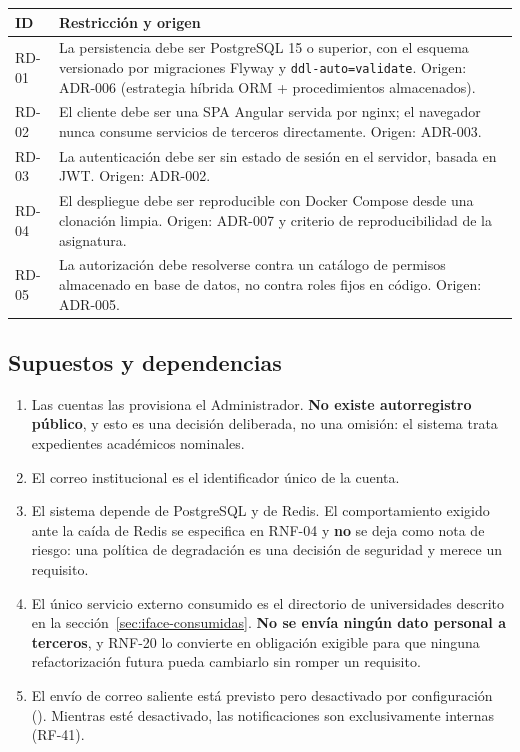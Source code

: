 \documentclass[11pt,a4paper]{article}
\DeclareRobustCommand{\cd}[1]{\texttt{\protect\seqsplit{#1}}}
\begin{document}
\begin{table}[H]\centering\small
\begin{tabular}{p{1.5cm} p{13.2cm}}
\toprule
\textbf{ID} & \textbf{Restricción y origen} \\
\midrule
RD-01 & La persistencia debe ser PostgreSQL 15 o superior, con el esquema versionado por
migraciones Flyway y \texttt{ddl-auto=validate}. Origen: ADR-006 (estrategia híbrida
ORM + procedimientos almacenados). \\
RD-02 & El cliente debe ser una SPA Angular servida por nginx; el navegador nunca consume
servicios de terceros directamente. Origen: ADR-003. \\
RD-03 & La autenticación debe ser sin estado de sesión en el servidor, basada en JWT.
Origen: ADR-002. \\
RD-04 & El despliegue debe ser reproducible con Docker Compose desde una clonación limpia.
Origen: ADR-007 y criterio de reproducibilidad de la asignatura. \\
RD-05 & La autorización debe resolverse contra un catálogo de permisos almacenado en base de
datos, no contra roles fijos en código. Origen: ADR-005. \\
\bottomrule
\end{tabular}
\end{table}

\subsection{Supuestos y dependencias}

\begin{enumerate}
    \item Las cuentas las provisiona el Administrador. \textbf{No existe autorregistro público},
          y esto es una decisión deliberada, no una omisión: el sistema trata expedientes
          académicos nominales.
    \item El correo institucional es el identificador único de la cuenta.
    \item El sistema depende de PostgreSQL y de Redis. El comportamiento exigido ante la caída
          de Redis se especifica en RNF-04 y \textbf{no} se deja como nota de riesgo: una
          política de degradación es una decisión de seguridad y merece un requisito.
    \item El único servicio externo consumido es el directorio de universidades descrito en la
          sección~\ref{sec:iface-consumidas}. \textbf{No se envía ningún dato personal a
          terceros}, y RNF-20 lo convierte en obligación exigible para que ninguna refactorización
          futura pueda cambiarlo sin romper un requisito.
    \item El envío de correo saliente está previsto pero desactivado por configuración
          (\cd{app.mail.enabled}). Mientras esté desactivado, las notificaciones son
          exclusivamente internas (RF-41).
\end{enumerate}
\end{document}
